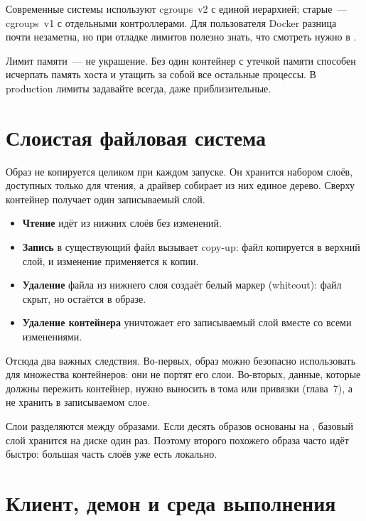 Современные системы используют cgroups~v2 с единой иерархией; старые~---
cgroups~v1 с отдельными контроллерами. Для пользователя Docker разница
почти незаметна, но при отладке лимитов полезно знать, что смотреть нужно
в .

\begin{tipbox}
Лимит памяти~--- не украшение. Без  один контейнер
с утечкой памяти способен исчерпать память хоста и утащить за собой
все остальные процессы. В production лимиты задавайте всегда, даже
приблизительные.
\end{tipbox}

\section{Слоистая файловая система}

Образ не копируется целиком при каждом запуске. Он хранится набором
слоёв, доступных только для чтения, а драйвер  собирает
из них единое дерево. Сверху контейнер получает один записываемый слой.

\begin{itemize}
  \item \textbf{Чтение} идёт из нижних слоёв без изменений.
  \item \textbf{Запись} в существующий файл вызывает copy-up: файл
        копируется в верхний слой, и изменение применяется к копии.
  \item \textbf{Удаление} файла из нижнего слоя создаёт белый маркер
        (whiteout): файл скрыт, но остаётся в образе.
  \item \textbf{Удаление контейнера} уничтожает его записываемый слой
        вместе со всеми изменениями.
\end{itemize}

Отсюда два важных следствия. Во-первых, образ можно безопасно использовать
для множества контейнеров: они не портят его слои. Во-вторых, данные,
которые должны пережить контейнер, нужно выносить в тома или привязки
(глава~7), а не хранить в записываемом слое.

\begin{notebox}
Слои разделяются между образами. Если десять образов основаны
на , базовый слой хранится на диске один раз.
Поэтому  второго похожего образа часто идёт быстро:
большая часть слоёв уже есть локально.
\end{notebox}

\section{Клиент, демон и среда выполнения}

